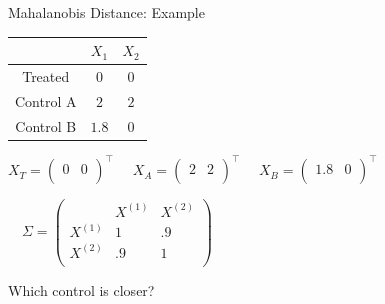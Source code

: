 \documentclass[xcolor=dvipsnames]{beamer}
\begin{document}
\begin{frame}{Mahalanobis Distance: Example}

\begin{table}[!h]
 \begin{center}
 \begin{tabular}{ccc}
\multicolumn{1}{l}{}&
\multicolumn{1}{c}{$X_1$}&
\multicolumn{1}{c}{$X_2$}
\\ \hline
Treated &$0$&$  0$\\
Control A &$ 2$&$2$\\
Control B &$ 1.8$&$0$\\
\hline
\end{tabular}
\end{center}
\end{table}

$X_T=\left(\begin{array}{cc} 0 & 0 \\ \end{array}      \right)^{\top} $
$\quad X_A=\left( \begin{array}{cc} 2 & 2 \\                 \end{array} \right)^{\top} $
$\quad X_B=\left( \begin{array}{cc} 1.8 &  0 \\                 \end{array} \right)^{\top} $\\\bigskip

$\quad \Sigma=\left( \begin{array}{ccc}                   & X^{(1)} & X^{(2)} \\                  
X^{(1)} & 1 &  .9 \\                  
X^{(2)} & .9 & 1\\  \end{array}              \right)$\\\bigskip

Which control is closer?

\end{frame}
\end{document}
